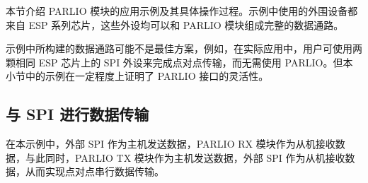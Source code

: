 \documentclass[main\_\_CN.tex]{subfiles}
\begin{document}
本节介绍 PARLIO 模块的应用示例及其具体操作过程。示例中使用的外围设备都来自 ESP 系列芯片，这些外设均可以和 PARLIO 模块组成完整的数据通路。

\begin{tiplisting}
示例中所构建的数据通路可能不是最佳方案，例如，在实际应用中，用户可使用两颗相同 ESP 芯片上的 SPI 外设来完成点对点传输，而无需使用 PARLIO。但本小节中的示例在一定程度上证明了 PARLIO 接口的灵活性。\end{tiplisting}

\subsection{与 SPI 进行数据传输}

在本示例中，外部 SPI 作为主机发送数据，PARLIO RX 模块作为从机接收数据，与此同时，PARLIO TX 模块作为主机发送数据，外部 SPI 作为从机接收数据，从而实现点对点串行数据传输。
\end{document}
